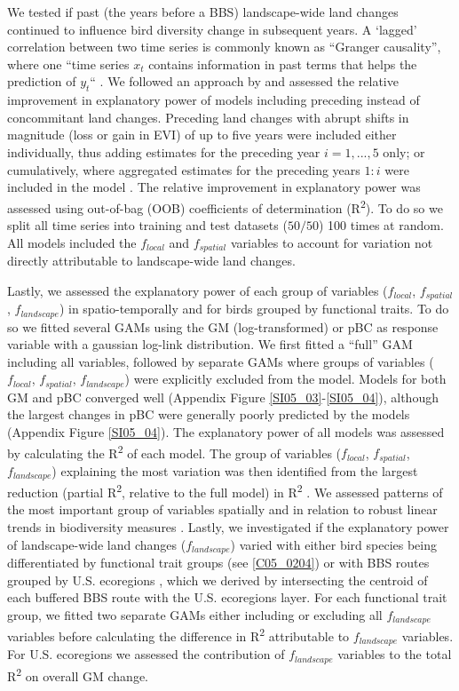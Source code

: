 We tested if past (\eg the years before a BBS) landscape-wide land changes continued to influence bird diversity change in subsequent years. A ‘lagged’ correlation between two time series is commonly known as “Granger causality”, where one “time series $x_t$ contains information in past terms that helps the prediction of $y_t$“ \citep{Granger1969}. We followed an approach by \cite{Papagiannopoulou2017} and assessed the relative improvement in explanatory power of models including preceding instead of concommitant land changes. Preceding land changes with abrupt shifts in magnitude (loss or gain in EVI) of up to five years were included either individually, thus adding estimates for the preceding year $i = 1,...,5$ only; or cumulatively, where aggregated estimates for the preceding years $1:i$ were included in the model \citep{Jung2018}. The relative improvement in explanatory power was assessed using out-of-bag (OOB) coefficients of determination (R\textsuperscript{2}). To do so we split all time series into training and test datasets ($50/50$) 100 times at random. All models included the $f_{local}$ and $f_{spatial}$ variables to account for variation not directly attributable to landscape-wide land changes.

Lastly, we assessed the explanatory power of each group of variables ($f_{local}$, $f_{spatial}$, $f_{landscape}$) in spatio-temporally and for birds grouped by functional traits. To do so we fitted several GAMs using the GM (log-transformed) or pBC as response variable with a gaussian log-link distribution. We first fitted a “full” GAM including all variables, followed by separate GAMs where groups of variables ($f_{local}$, $f_{spatial}$, $f_{landscape}$) were explicitly excluded from the model. Models for both GM and pBC converged well (Appendix Figure \ref{SI05_03}-\ref{SI05_04}), although the largest changes in pBC were generally poorly predicted by the models (Appendix Figure \ref{SI05_04}). The explanatory power of all models was assessed by calculating the R\textsuperscript{2} of each model. The group of variables ($f_{local}$, $f_{spatial}$, $f_{landscape}$) explaining the most variation was then identified from the largest reduction (partial R\textsuperscript{2}, relative to the full model) in R\textsuperscript{2} \citep{Papagiannopoulou2017}. We assessed patterns of the most important group of variables spatially and in relation to robust linear trends in biodiversity measures \citep[fitted using the MASS package, ver. 7.3-49,][]{Venables2002}. Lastly, we investigated if the explanatory power of landscape-wide land changes ($f_{landscape}$) varied with either bird species being differentiated by functional trait groups (see \ref{C05_0204}) or with BBS routes grouped by U.S. ecoregions \citep[Level 1,][]{Omernik1987}, which we derived by intersecting the centroid of each buffered BBS route with the U.S. ecoregions layer. For each functional trait group, we fitted two separate GAMs either including or excluding all $f_{landscape}$ variables before calculating the difference in R\textsuperscript{2} attributable to $f_{landscape}$ variables. For U.S. ecoregions we assessed the contribution of $f_{landscape}$ variables to the total R\textsuperscript{2} on overall GM change.

